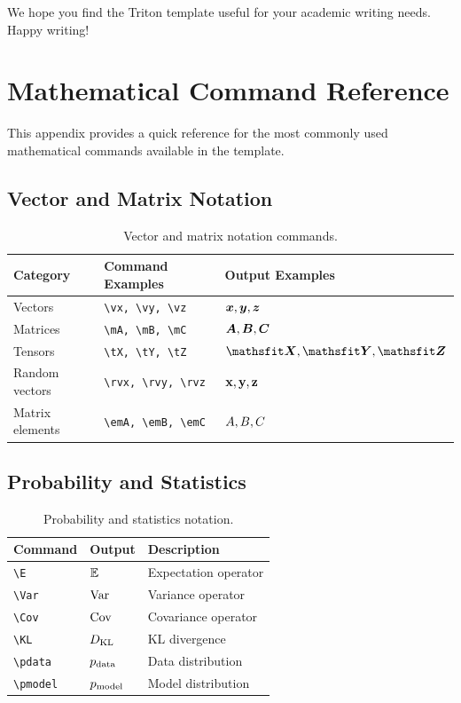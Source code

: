 \documentclass{triton}
\begin{document}
We hope you find the Triton template useful for your academic writing needs. Happy writing!

\newpage



\newpage
\beginappendix

\section{Mathematical Command Reference}
\label{sec:math}

This appendix provides a quick reference for the most commonly used mathematical commands available in the template.

\subsection{Vector and Matrix Notation}

\begin{table}[htbp]
\centering
\small
\begin{tabular}{@{}lll@{}}
\toprule
\textbf{Category} & \textbf{Command Examples} & \textbf{Output Examples} \\
\midrule
Vectors & \verb|\vx, \vy, \vz| & ${\bm{x}}, {\bm{y}}, {\bm{z}}$ \\
Matrices & \verb|\mA, \mB, \mC| & ${\bm{A}}, {\bm{B}}, {\bm{C}}$ \\
Tensors & \verb|\tX, \tY, \tZ| & $\tX, \tY, \tZ$ \\
Random vectors & \verb|\rvx, \rvy, \rvz| & ${\mathbf{x}}, {\mathbf{y}}, {\mathbf{z}}$ \\
Matrix elements & \verb|\emA, \emB, \emC| & ${A}, {B}, {C}$ \\
\bottomrule
\end{tabular}
\caption{Vector and matrix notation commands.}
\end{table}

\subsection{Probability and Statistics}

\begin{table}[htbp]
\centering
\small
\begin{tabular}{@{}lll@{}}
\toprule
\textbf{Command} & \textbf{Output} & \textbf{Description} \\
\midrule
\verb|\E| & $\mathbb{E}$ & Expectation operator \\
\verb|\Var| & $\mathrm{Var}$ & Variance operator \\
\verb|\Cov| & $\mathrm{Cov}$ & Covariance operator \\
\verb|\KL| & $D_{\mathrm{KL}}$ & KL divergence \\
\verb|\pdata| & $p_{\rm{data}}$ & Data distribution \\
\verb|\pmodel| & $p_{\rm{model}}$ & Model distribution \\
\bottomrule
\end{tabular}
\caption{Probability and statistics notation.}
\end{table}
\end{document}
